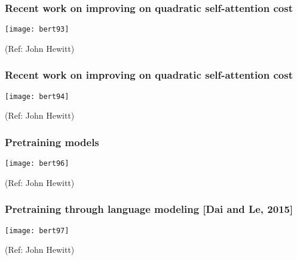 \begin{frame}[fragile]\frametitle{Recent work on improving on quadratic self-attention cost}

			
			\begin{center}
			\texttt{[image: bert93]}
			\end{center}		
			
			{\tiny (Ref: John Hewitt)}

\end{frame}

\begin{frame}[fragile]\frametitle{Recent work on improving on quadratic self-attention cost}

			
			\begin{center}
			\texttt{[image: bert94]}
			\end{center}		
			
			{\tiny (Ref: John Hewitt)}

\end{frame}


			
			


\begin{frame}[fragile]\frametitle{Pretraining models}

			
			\begin{center}
			\texttt{[image: bert96]}
			\end{center}		
			
			{\tiny (Ref: John Hewitt)}

\end{frame}

\begin{frame}[fragile]\frametitle{Pretraining through language modeling [Dai and Le, 2015]}

			
			\begin{center}
			\texttt{[image: bert97]}
			\end{center}		
			
			{\tiny (Ref: John Hewitt)}

\end{frame}

